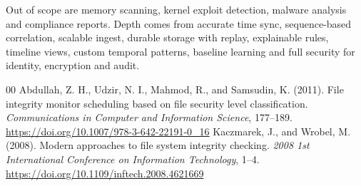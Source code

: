 \documentclass[conference]{IEEEtran}
\begin{document}
Out of scope are memory scanning, kernel exploit detection, malware analysis and compliance reports. Depth comes from accurate time sync, sequence-based correlation, scalable ingest, durable storage with replay, explainable rules, timeline views, custom temporal patterns, baseline learning and full security for identity, encryption and audit.

\begin{thebibliography}{00}
     Abdullah, Z. H., Udzir, N. I., Mahmod, R., and Samsudin, K. (2011). File integrity monitor scheduling based on file security level classification. \textit{Communications in Computer and Information Science}, 177--189. \url{https://doi.org/10.1007/978-3-642-22191-0_16}
     Kaczmarek, J., and Wrobel, M. (2008). Modern approaches to file system integrity checking. \textit{2008 1st International Conference on Information Technology}, 1--4. \url{https://doi.org/10.1109/inftech.2008.4621669}
\end{thebibliography}
\end{document}
